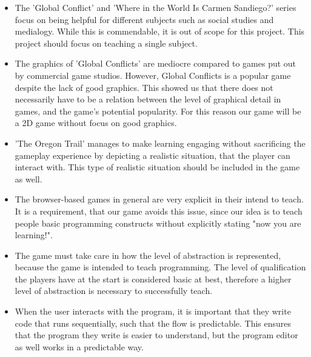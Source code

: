 \begin{itemize}
	\item The 'Global Conflict' and 'Where in the World Is Carmen Sandiego?' series focus on being helpful for different subjects such as social studies and medialogy.
While this is commendable, it is out of scope for this project.
This project should focus on teaching a single subject.
	\item The graphics of 'Global Conflicts' are mediocre compared to games put out by commercial game studios.
	However, Global Conflicts is a popular game despite the lack of good graphics.
	This showed us that there does not necessarily have to be a relation between the level of graphical detail in games, and the game's potential popularity.
	For this reason our game will be a 2D game without focus on good graphics.
	\item 'The Oregon Trail' manages to make learning engaging without sacrificing the gameplay experience by depicting a realistic situation, that the player can interact with.
	This type of realistic situation should be included in the game as well.
	\item The browser-based games in general are very explicit in their intend to teach.
	It is a requirement, that our game avoids this issue, since our idea is to teach people basic programming constructs without explicitly stating "now you are learning!".
	\item The game must take care in how the level of abstraction is represented, because the game is intended to teach programming.
	The level of qualification the players have at the start is considered basic at best, therefore a higher level of abstraction is necessary to successfully teach.
	\item When the user interacts with the program, it is important that they write code that runs sequentially, such that the flow is predictable.
	This ensures that the program they write is easier to understand, but the program editor as well works in a predictable way.
\end{itemize}


